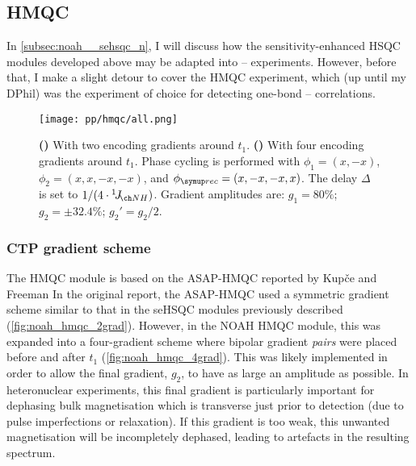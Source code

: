 \subsection{\texorpdfstring{\nitrogen{}}{15N} HMQC}
\label{subsec:noah__hmqc}

In \cref{subsec:noah__sehsqc_n}, I will discuss how the sensitivity-enhanced HSQC modules developed above may be adapted into \proton{}--\nitrogen{} experiments.
However, before that, I make a slight detour to cover the \nitrogen{} HMQC experiment, which (up until my DPhil) was the experiment of choice for detecting one-bond \proton{}--\nitrogen{} correlations.

\begin{figure}[htb]
    \centering
    \texttt{[image: pp/hmqc/all.png]}%
    {\label{fig:noah_hmqc_2grad}}%
    {\label{fig:noah_hmqc_4grad}}%
    \caption[NOAH HMQC pulse sequences]{
        \textbf{()} With two encoding gradients around $t_1$.
        \textbf{()} With four encoding gradients around $t_1$.
        Phase cycling is performed with $\phi_1 = (x, -x)$, $\phi_2 = (x, x, -x, -x)$, and $\phirec = (x, -x, -x, x)$.
        The delay $\Delta$ is set to $1 / (4 \cdot \oneJ{NH})$.
        Gradient amplitudes are: $g_1 = 80\%$; $g_2 = \pm 32.4\%$; $g_2' = g_2/2$.
    }
    \label{fig:noah_hmqc}
\end{figure}


\subsubsection{CTP gradient scheme}

The HMQC module is based on the ASAP-HMQC reported by Kup{\v{c}}e and Freeman\autocite{Kupce2007MRC}
In the original report, the ASAP-HMQC used a symmetric gradient scheme similar to that in the seHSQC modules previously described (\cref{fig:noah_hmqc_2grad}).
However, in the NOAH HMQC module\autocite{Kupce2017ACIE}, this was expanded into a four-gradient scheme where bipolar gradient \textit{pairs} were placed before and after $t_1$ (\cref{fig:noah_hmqc_4grad}).
This was likely implemented in order to allow the final gradient, $g_2$, to have as large an amplitude as possible.
In heteronuclear experiments, this final gradient is particularly important for dephasing bulk magnetisation which is transverse just prior to detection (due to pulse imperfections or relaxation).
If this gradient is too weak, this unwanted magnetisation will be incompletely dephased, leading to artefacts in the resulting spectrum.

